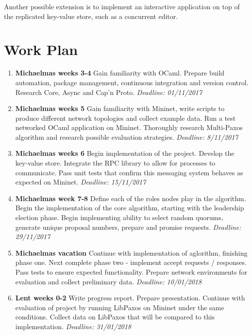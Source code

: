 Another possible extension is to implement an interactive application on top of the replicated key-value store, such as a concurrent editor.

\section*{Work Plan}
\begin{enumerate}
  \item {\bf{}Michaelmas weeks 3-4} Gain familiarity with OCaml. Prepare build automation, package management, continuous integration and version control. Research Core, Async and Cap'n Proto.{\em{} Deadline: 01/11/2017}
   
  \item {\bf{}Michaelmas weeks 5} Gain familiarity with Mininet, write scripts to produce different network topologies and collect example data. Run a test networked OCaml application on Mininet. Thoroughly research Multi-Paxos algorithm and research possible evaluation strategies.{\em{} Deadline: 8/11/2017}
 
   \item {\bf{}Michaelmas weeks 6} Begin implementation of the project. Develop the key-value store. Integrate the RPC library to allow for processes to communicate. Pass unit tests that confirm this messaging system behaves as expected on Mininet.{\em{} Deadline: 15/11/2017}
   
\item {\bf{}Michaelmas week 7-8} Define each of the roles nodes play in the algorithm. Begin the implementation of the core algorithm, starting with the leadership election phase. Begin implementing ability to select random quorums, generate unique proposal numbers, prepare and promise requests.{\em{} Deadline: 29/11/2017}

  \item {\bf{}Michaelmas vacation} Continue with implementation of aglorithm, finishing phase one. Next complete phase two - implement accept requests / responses. Pass tests to ensure expected functionality. Prepare network environments for evaluation and collect preliminary data.{\em{} Deadline: 10/01/2018}
  
  \item {\bf{}Lent weeks 0-2} Write progress report. Prepare presentation. Continue with evaluation of project by running LibPaxos on Mininet under the same conditions. Collect data on LibPaxos that will be compared to this implementation. {\em{} Deadline: 31/01/2018}


\end{enumerate}
